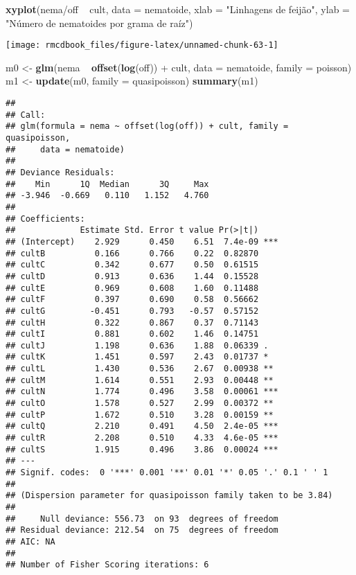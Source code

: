 \documentclass[9pt,a5paper,]{book}
\newenvironment{Shaded}{}{}
\newcommand{\KeywordTok}[1]{\textbf{{#1}}}
\newcommand{\DataTypeTok}[1]{\underline{{#1}}}
\newcommand{\StringTok}[1]{{#1}}
\newcommand{\NormalTok}[1]{{#1}}
\renewenvironment{Shaded}{\color{inputcolor}}{}
\renewcommand{\DataTypeTok}[1]{{#1}}
\theoremstyle{definition}
\theoremstyle{definition}
\theoremstyle{remark}
\begin{document}
\begin{Shaded}
\begin{Highlighting}[]
\KeywordTok{xyplot}\NormalTok{(nema/off ~}\StringTok{ }\NormalTok{cult, }\DataTypeTok{data =} \NormalTok{nematoide,}
       \DataTypeTok{xlab =} \StringTok{"Linhagens de feijão"}\NormalTok{,}
       \DataTypeTok{ylab =} \StringTok{"Número de nematoides por grama de raíz"}\NormalTok{)}
\end{Highlighting}
\end{Shaded}

\begin{center}\texttt{[image: rmcdbook\_files/figure-latex/unnamed-chunk-63-1]} \end{center}

\begin{Shaded}
\begin{Highlighting}[]
\NormalTok{m0 <-}\StringTok{ }\KeywordTok{glm}\NormalTok{(nema ~}\StringTok{ }\KeywordTok{offset}\NormalTok{(}\KeywordTok{log}\NormalTok{(off)) +}\StringTok{ }\NormalTok{cult,}
          \DataTypeTok{data =} \NormalTok{nematoide,}
          \DataTypeTok{family =} \NormalTok{poisson)}
\NormalTok{m1 <-}\StringTok{ }\KeywordTok{update}\NormalTok{(m0, }\DataTypeTok{family =} \NormalTok{quasipoisson)}
\KeywordTok{summary}\NormalTok{(m1)}
\end{Highlighting}
\end{Shaded}

\begin{verbatim}
## 
## Call:
## glm(formula = nema ~ offset(log(off)) + cult, family = quasipoisson, 
##     data = nematoide)
## 
## Deviance Residuals: 
##    Min      1Q  Median      3Q     Max  
## -3.946  -0.669   0.110   1.152   4.760  
## 
## Coefficients:
##             Estimate Std. Error t value Pr(>|t|)    
## (Intercept)    2.929      0.450    6.51  7.4e-09 ***
## cultB          0.166      0.766    0.22  0.82870    
## cultC          0.342      0.677    0.50  0.61515    
## cultD          0.913      0.636    1.44  0.15528    
## cultE          0.969      0.608    1.60  0.11488    
## cultF          0.397      0.690    0.58  0.56662    
## cultG         -0.451      0.793   -0.57  0.57152    
## cultH          0.322      0.867    0.37  0.71143    
## cultI          0.881      0.602    1.46  0.14751    
## cultJ          1.198      0.636    1.88  0.06339 .  
## cultK          1.451      0.597    2.43  0.01737 *  
## cultL          1.430      0.536    2.67  0.00938 ** 
## cultM          1.614      0.551    2.93  0.00448 ** 
## cultN          1.774      0.496    3.58  0.00061 ***
## cultO          1.578      0.527    2.99  0.00372 ** 
## cultP          1.672      0.510    3.28  0.00159 ** 
## cultQ          2.210      0.491    4.50  2.4e-05 ***
## cultR          2.208      0.510    4.33  4.6e-05 ***
## cultS          1.915      0.496    3.86  0.00024 ***
## ---
## Signif. codes:  0 '***' 0.001 '**' 0.01 '*' 0.05 '.' 0.1 ' ' 1
## 
## (Dispersion parameter for quasipoisson family taken to be 3.84)
## 
##     Null deviance: 556.73  on 93  degrees of freedom
## Residual deviance: 212.54  on 75  degrees of freedom
## AIC: NA
## 
## Number of Fisher Scoring iterations: 6
\end{verbatim}
\end{document}
